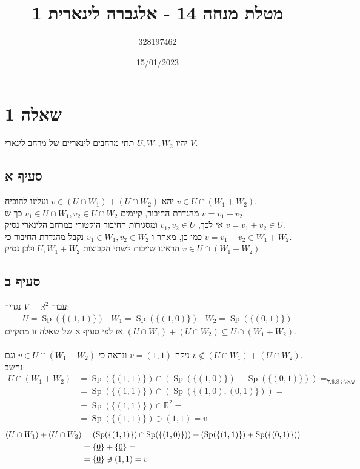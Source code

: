 \documentclass{article}
\title{מטלת מנחה 14 - אלגברה לינארית 1}
\author{328197462}
\date{15/01/2023}
\newcommand\niton{\not\mathrel{\text{\reflectbox{$\in$}}}}
\DeclareMathOperator*{\equals}{=}
\DeclareMathOperator\Sp{Sp}
\def\reals{\mathbb{R}}
\def\zerovec{\underline{0}}
\begin{document}
\maketitle

\section*{שאלה 1}

יהיו $U, W_1, W_2$ תתי-מרחבים לינאריים של מרחב לינארי $V$.

\subsection*{סעיף א}

יהא $v\in(U\cap W_1)+(U\cap W_2)$
ועלינו להוכיח $v\in U\cap (W_1+W_2)$.
\\
מהגדרת החיבור, קיימים $v_1\in U\cap W_1, v_2\in U\cap W_2$ כך ש $v=v_1+v_2$.\\
אי לכך, $v_1, v_2\in U$ ומסגירות החיבור הוקטורי במרחב הלינארי נסיק $v=v_1+v_2\in U$. \\
כמו כן, מאחר ו $v_1\in W_1, v_2\in W_2$ נקבל מהגדרת החיבור כי $v=v_1+v_2\in W_1+W_2$. \\
הראינו שייכות לשתי הקבוצות $U, W_1+W_2$ ולכן נסיק $v\in U\cap (W_1+W_2)$

\subsection*{סעיף ב}

עבור $V=\reals^2$ נגדיר:
\[
    \begin{matrix}
        U=\Sp(\{ (1,1) \})   &
        W_1=\Sp(\{ (1,0) \}) &
        W_2=\Sp(\{ (0,1) \})
    \end{matrix}
\]
אז לפי סעיף א של שאלה זו מתקיים $(U\cap W_1)+(U\cap W_2)\subseteq U\cap (W_1+W_2)$. \\\\
ניקח $v=(1,1)$ ונראה כי $v\in U\cap (W_1+W_2)$ וגם $v\notin (U\cap W_1)+(U\cap W_2)$.\\
נחשב:
\begin{align*}
    U\cap (W_1+W_2)
     & =\Sp(\{ (1,1) \}) \cap (\Sp(\{ (1,0) \}) + \Sp(\{ (0,1) \})) \equals_{\text{שאלה 7.6.8}} \\
     & =\Sp(\{ (1,1) \}) \cap (\Sp(\{ (1,0), (0,1) \}))=                                        \\
     & =\Sp(\{ (1,1) \}) \cap \reals^2 =                                                        \\
     & =\Sp(\{ (1,1) \})\ni (1,1)=v
\end{align*}
\begin{align*}
    (U\cap W_1)+(U\cap W_2)
     & =(\Sp(\{ (1,1) \})\cap \Sp(\{ (1,0) \}))+(\Sp(\{ (1,1) \}) + \Sp(\{ (0,1) \}))= \\
     & =\{\zerovec\} + \{\zerovec\} =                                                  \\
     & = \{\zerovec\}\niton (1,1)=v
\end{align*}
\end{document}
